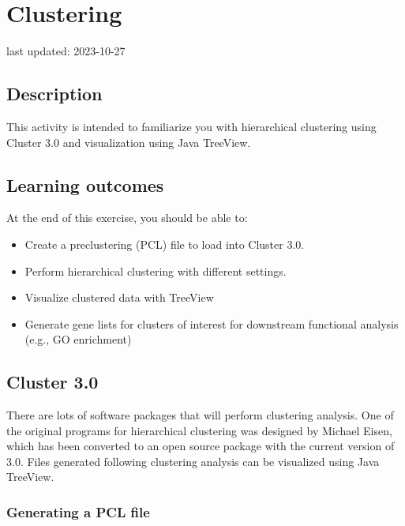 \documentclass[
]{book}
\providecommand{\tightlist}{%
  \setlength{\itemsep}{0pt}\setlength{\parskip}{0pt}}
\begin{document}
\hypertarget{clustering}{%
\chapter{Clustering}\label{clustering}}

last updated: 2023-10-27

\hypertarget{description-6}{%
\section{Description}\label{description-6}}

This activity is intended to familiarize you with hierarchical clustering using Cluster 3.0 and visualization using Java TreeView.

\hypertarget{learning-outcomes-6}{%
\section{Learning outcomes}\label{learning-outcomes-6}}

At the end of this exercise, you should be able to:

\begin{itemize}
\tightlist
\item
  Create a preclustering (PCL) file to load into Cluster 3.0.
\item
  Perform hierarchical clustering with different settings.
\item
  Visualize clustered data with TreeView
\item
  Generate gene lists for clusters of interest for downstream functional analysis (e.g., GO enrichment)
\end{itemize}

\hypertarget{cluster-3.0}{%
\section{Cluster 3.0}\label{cluster-3.0}}

There are lots of software packages that will perform clustering analysis. One of the original programs for hierarchical clustering was designed by Michael Eisen, which has been converted to an open source package with the current version of 3.0. Files generated following clustering analysis can be visualized using Java TreeView.

\hypertarget{generating-a-pcl-file}{%
\subsection{Generating a PCL file}\label{generating-a-pcl-file}}
\end{document}

